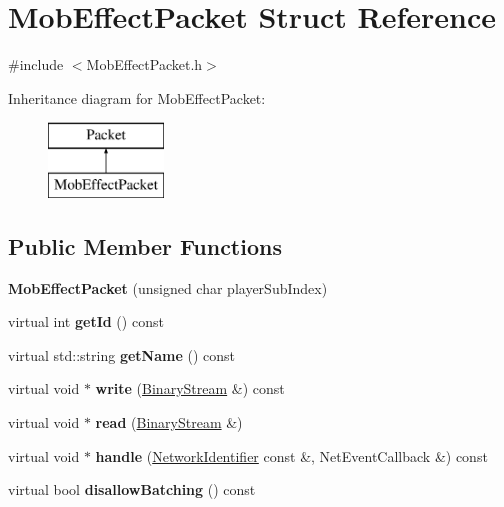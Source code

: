 \hypertarget{struct_mob_effect_packet}{}\section{Mob\+Effect\+Packet Struct Reference}
\label{struct_mob_effect_packet}


{\ttfamily \#include $<$Mob\+Effect\+Packet.\+h$>$}

Inheritance diagram for Mob\+Effect\+Packet\+:\begin{figure}[H]
\begin{center}
\leavevmode
\includegraphics[height=2.000000cm]{struct_mob_effect_packet}
\end{center}
\end{figure}
\subsection*{Public Member Functions}
\begin{DoxyCompactItemize}
\item 
\mbox{\label{struct_mob_effect_packet_aadbe2d1346eb128bdfffb5d4e62f774f}} 
{\bfseries Mob\+Effect\+Packet} (unsigned char player\+Sub\+Index)
\item 
\mbox{\label{struct_mob_effect_packet_aa0527038fd4ae94faac1fb1e1682eba5}} 
virtual int {\bfseries get\+Id} () const
\item 
\mbox{\label{struct_mob_effect_packet_a3736b9135fa1bc5ab0ad8caa843cd732}} 
virtual std\+::string {\bfseries get\+Name} () const
\item 
\mbox{\label{struct_mob_effect_packet_a38f4bd1a60102d36a01655232251c44e}} 
virtual void $\ast$ {\bfseries write} (\mbox{\hyperlink{struct_binary_stream}{Binary\+Stream}} \&) const
\item 
\mbox{\label{struct_mob_effect_packet_a998e209ee9db49dd44a68043871466f9}} 
virtual void $\ast$ {\bfseries read} (\mbox{\hyperlink{struct_binary_stream}{Binary\+Stream}} \&)
\item 
\mbox{\label{struct_mob_effect_packet_ab99f0f5ac20760c60425676c3abf5c17}} 
virtual void $\ast$ {\bfseries handle} (\mbox{\hyperlink{struct_network_identifier}{Network\+Identifier}} const \&, Net\+Event\+Callback \&) const
\item 
\mbox{\label{struct_mob_effect_packet_a4b3ae328d918c391b5d1a63afd6b874f}} 
virtual bool {\bfseries disallow\+Batching} () const
\end{DoxyCompactItemize}
